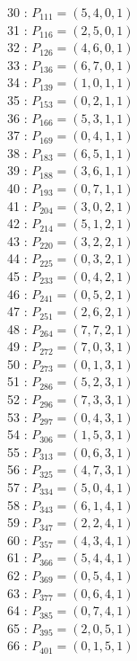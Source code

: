\documentclass{article}
\begin{document}
{\begin{multicols}{3}
30 : $P_{111}=( 5, 4, 0, 1 )$\\
31 : $P_{116}=( 2, 5, 0, 1 )$\\
32 : $P_{126}=( 4, 6, 0, 1 )$\\
33 : $P_{136}=( 6, 7, 0, 1 )$\\
34 : $P_{139}=( 1, 0, 1, 1 )$\\
35 : $P_{153}=( 0, 2, 1, 1 )$\\
36 : $P_{166}=( 5, 3, 1, 1 )$\\
37 : $P_{169}=( 0, 4, 1, 1 )$\\
38 : $P_{183}=( 6, 5, 1, 1 )$\\
39 : $P_{188}=( 3, 6, 1, 1 )$\\
40 : $P_{193}=( 0, 7, 1, 1 )$\\
41 : $P_{204}=( 3, 0, 2, 1 )$\\
42 : $P_{214}=( 5, 1, 2, 1 )$\\
43 : $P_{220}=( 3, 2, 2, 1 )$\\
44 : $P_{225}=( 0, 3, 2, 1 )$\\
45 : $P_{233}=( 0, 4, 2, 1 )$\\
46 : $P_{241}=( 0, 5, 2, 1 )$\\
47 : $P_{251}=( 2, 6, 2, 1 )$\\
48 : $P_{264}=( 7, 7, 2, 1 )$\\
49 : $P_{272}=( 7, 0, 3, 1 )$\\
50 : $P_{273}=( 0, 1, 3, 1 )$\\
51 : $P_{286}=( 5, 2, 3, 1 )$\\
52 : $P_{296}=( 7, 3, 3, 1 )$\\
53 : $P_{297}=( 0, 4, 3, 1 )$\\
54 : $P_{306}=( 1, 5, 3, 1 )$\\
55 : $P_{313}=( 0, 6, 3, 1 )$\\
56 : $P_{325}=( 4, 7, 3, 1 )$\\
57 : $P_{334}=( 5, 0, 4, 1 )$\\
58 : $P_{343}=( 6, 1, 4, 1 )$\\
59 : $P_{347}=( 2, 2, 4, 1 )$\\
60 : $P_{357}=( 4, 3, 4, 1 )$\\
61 : $P_{366}=( 5, 4, 4, 1 )$\\
62 : $P_{369}=( 0, 5, 4, 1 )$\\
63 : $P_{377}=( 0, 6, 4, 1 )$\\
64 : $P_{385}=( 0, 7, 4, 1 )$\\
65 : $P_{395}=( 2, 0, 5, 1 )$\\
66 : $P_{401}=( 0, 1, 5, 1 )$\\

\end{multicols}}
\end{document}
